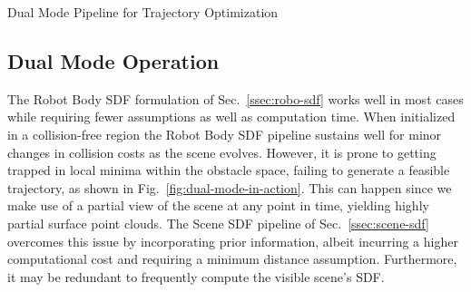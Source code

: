\documentclass[letterpaper, 10 pt, conference]{ieeeconf}  %
\begin{document}
\begin{algorithm}[t]
    \caption{\label{algo:dual-mode}
        Dual Mode Pipeline for Trajectory Optimization
    }
    \begin{algorithmic}[1]
         
         
         
         

         
         
         

                 
                 
            \EndFor
             
        \Else
        \EndIf
    \end{algorithmic}
\end{algorithm}

\subsection{Dual Mode Operation}

The Robot Body SDF formulation of Sec.~\ref{ssec:robo-sdf} works well in most cases while requiring fewer assumptions as well as computation time.
When initialized in a collision-free region the Robot Body SDF pipeline sustains well for minor changes in collision costs as the scene evolves.
However, it is prone to getting trapped in local minima within the obstacle space, failing to generate a feasible trajectory, as shown in Fig.~\ref{fig:dual-mode-in-action}.
This can happen since we make use of a partial view of the scene at any point in time, yielding highly partial surface point clouds.
The Scene SDF pipeline of Sec.~\ref{ssec:scene-sdf} overcomes this issue by incorporating prior information, albeit incurring a higher computational cost and requiring a minimum distance assumption.
Furthermore, it may be redundant to frequently compute the visible scene's SDF.
\end{document}
